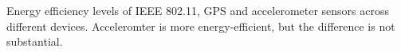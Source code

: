 Energy efficiency levels of IEEE 802.11, GPS and accelerometer sensors across different devices. Acceleromter is more energy-efficient, but the difference is not substantial.
